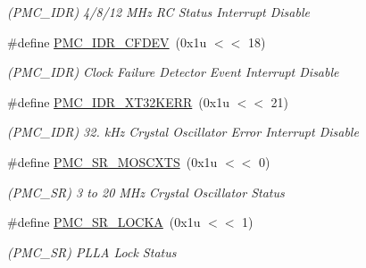 \begin{DoxyCompactItemize}
\begin{DoxyCompactList}\small\item\em (P\+M\+C\+\_\+\+I\+DR) 4/8/12 M\+Hz RC Status Interrupt Disable \end{DoxyCompactList}\item 
\mbox{\label{group__SAMV71__PMC_gad5c4de338e4ef9731b57b234acc8aec2}} 
\#define \mbox{\hyperlink{group__SAMV71__PMC_gad5c4de338e4ef9731b57b234acc8aec2}{P\+M\+C\+\_\+\+I\+D\+R\+\_\+\+C\+F\+D\+EV}}~(0x1u $<$$<$ 18)
\begin{DoxyCompactList}\small\item\em (P\+M\+C\+\_\+\+I\+DR) Clock Failure Detector Event Interrupt Disable \end{DoxyCompactList}\item 
\mbox{\label{group__SAMV71__PMC_gabc264dea503c055150f54375910cc7ce}} 
\#define \mbox{\hyperlink{group__SAMV71__PMC_gabc264dea503c055150f54375910cc7ce}{P\+M\+C\+\_\+\+I\+D\+R\+\_\+\+X\+T32\+K\+E\+RR}}~(0x1u $<$$<$ 21)
\begin{DoxyCompactList}\small\item\em (P\+M\+C\+\_\+\+I\+DR) 32. k\+Hz Crystal Oscillator Error Interrupt Disable \end{DoxyCompactList}\item 
\mbox{\label{group__SAMV71__PMC_ga8fc9ea4663e676dba2f1ce4025589743}} 
\#define \mbox{\hyperlink{group__SAMV71__PMC_ga8fc9ea4663e676dba2f1ce4025589743}{P\+M\+C\+\_\+\+S\+R\+\_\+\+M\+O\+S\+C\+X\+TS}}~(0x1u $<$$<$ 0)
\begin{DoxyCompactList}\small\item\em (P\+M\+C\+\_\+\+SR) 3 to 20 M\+Hz Crystal Oscillator Status \end{DoxyCompactList}\item 
\mbox{\label{group__SAMV71__PMC_ga67cebbfa3dfaf290083553d717b48101}} 
\#define \mbox{\hyperlink{group__SAMV71__PMC_ga67cebbfa3dfaf290083553d717b48101}{P\+M\+C\+\_\+\+S\+R\+\_\+\+L\+O\+C\+KA}}~(0x1u $<$$<$ 1)
\begin{DoxyCompactList}\small\item\em (P\+M\+C\+\_\+\+SR) P\+L\+LA Lock Status \end{DoxyCompactList}\item 
\mbox{\label{group__SAMV71__PMC_gae742c07d37e3011571a705ca768a5fee}} 

\end{DoxyCompactItemize}
